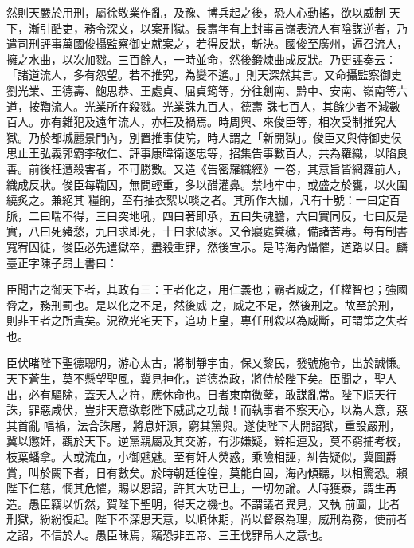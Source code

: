 \begin{pinyinscope}
 然則天嚴於用刑，屬徐敬業作亂，及豫、博兵起之後，恐人心動搖，欲以威制
 天下，漸引酷吏，務令深文，以案刑獄。長壽年有上封事言嶺表流人有陰謀逆者，乃遣司刑評事萬國俊攝監察御史就案之，若得反狀，斬決。國俊至廣州，遍召流人，擁之水曲，以次加戮。三百餘人，一時並命，然後鍛煉曲成反狀。乃更誣奏云：「諸道流人，多有怨望。若不推究，為變不遙。」則天深然其言。又命攝監察御史劉光業、王德壽、鮑思恭、王處貞、屈貞筠等，分往劍南、黔中、安南、嶺南等六道，按鞫流人。光業所在殺戮。光業誅九百人，德壽
 誅七百人，其餘少者不減數百人。亦有雜犯及遠年流人，亦枉及禍焉。時周興、來俊臣等，相次受制推究大獄。乃於都城麗景門內，別置推事使院，時人謂之「新開獄」。俊臣又與侍御史侯思止王弘義郭霸李敬仁、評事康暐衛遂忠等，招集告事數百人，共為羅織，以陷良善。前後枉遭殺害者，不可勝數。又造《告密羅織經》一卷，其意旨皆網羅前人，織成反狀。俊臣每鞫囚，無問輕重，多以醋灌鼻。禁地牢中，或盛之於甕，以火圍繞炙之。兼絕其
 糧餉，至有抽衣絮以啖之者。其所作大枷，凡有十號：一曰定百脈，二曰喘不得，三曰突地吼，四曰著即承，五曰失魂膽，六曰實同反，七曰反是實，八曰死豬愁，九曰求即死，十曰求破家。又令寢處糞穢，備諸苦毒。每有制書寬宥囚徒，俊臣必先遣獄卒，盡殺重罪，然後宣示。是時海內懾懼，道路以目。麟臺正字陳子昂上書曰：



 臣聞古之御天下者，其政有三：王者化之，用仁義也；霸者威之，任權智也；強國脅之，務刑罰也。是以化之不足，然後威
 之，威之不足，然後刑之。故至於刑，則非王者之所貴矣。況欲光宅天下，追功上皇，專任刑殺以為威斷，可謂策之失者也。



 臣伏睹陛下聖德聰明，游心太古，將制靜宇宙，保乂黎民，發號施令，出於誠慊。天下蒼生，莫不懸望聖風，冀見神化，道德為政，將侍於陛下矣。臣聞之，聖人出，必有驅除，蓋天人之符，應休命也。日者東南微孽，敢謀亂常。陛下順天行誅，罪惡咸伏，豈非天意欲彰陛下威武之功哉！而執事者不察天心，以為人意，惡其首亂
 唱禍，法合誅屠，將息奸源，窮其黨與。遂使陛下大開詔獄，重設嚴刑，冀以懲奸，觀於天下。逆黨親屬及其交游，有涉嫌疑，辭相連及，莫不窮捕考校，枝葉蟠拿。大或流血，小御魑魅。至有奸人熒惑，乘險相誣，糾告疑似，冀圖爵賞，叫於闕下者，日有數矣。於時朝廷徨徨，莫能自固，海內傾聽，以相驚恐。賴陛下仁慈，憫其危懼，賜以恩詔，許其大功已上，一切勿論。人時獲泰，謂生再造。愚臣竊以忻然，賀陛下聖明，得天之機也。不謂議者異見，又執
 前圖，比者刑獄，紛紛復起。陛下不深思天意，以順休期，尚以督察為理，威刑為務，使前者之詔，不信於人。愚臣昧焉，竊恐非五帝、三王伐罪吊人之意也。




\end{pinyinscope}
